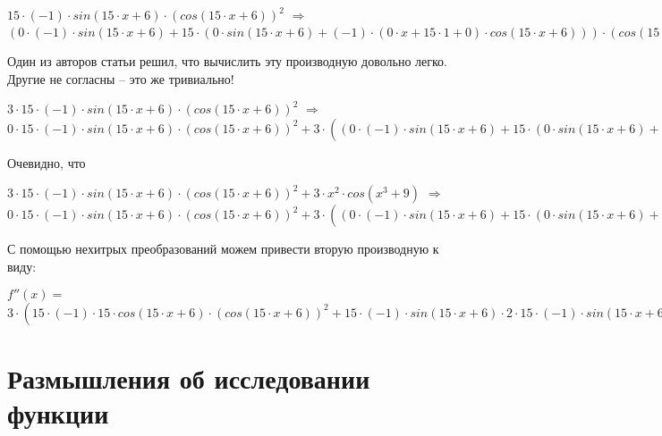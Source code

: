 \documentclass{article}
\begin{document}
$15 \cdot (-1) \cdot  sin (15 \cdot x + 6) \cdot ( cos (15 \cdot x + 6)) ^ {2}$ $\Rightarrow$ $(0 \cdot (-1) \cdot  sin (15 \cdot x + 6) + 15 \cdot (0 \cdot  sin (15 \cdot x + 6) + (-1) \cdot (0 \cdot x + 15 \cdot 1 + 0) \cdot  cos (15 \cdot x + 6))) \cdot ( cos (15 \cdot x + 6)) ^ {2} + 15 \cdot (-1) \cdot  sin (15 \cdot x + 6) \cdot 2 \cdot (0 \cdot x + 15 \cdot 1 + 0) \cdot (-1) \cdot  sin (15 \cdot x + 6) \cdot ( cos (15 \cdot x + 6)) ^ {2 - 1}$

Один из авторов статьи решил, что вычислить эту производную довольно легко. Другие не согласны -- это же тривиально!

$3 \cdot 15 \cdot (-1) \cdot  sin (15 \cdot x + 6) \cdot ( cos (15 \cdot x + 6)) ^ {2}$ $\Rightarrow$ $0 \cdot 15 \cdot (-1) \cdot  sin (15 \cdot x + 6) \cdot ( cos (15 \cdot x + 6)) ^ {2} + 3 \cdot ((0 \cdot (-1) \cdot  sin (15 \cdot x + 6) + 15 \cdot (0 \cdot  sin (15 \cdot x + 6) + (-1) \cdot (0 \cdot x + 15 \cdot 1 + 0) \cdot  cos (15 \cdot x + 6))) \cdot ( cos (15 \cdot x + 6)) ^ {2} + 15 \cdot (-1) \cdot  sin (15 \cdot x + 6) \cdot 2 \cdot (0 \cdot x + 15 \cdot 1 + 0) \cdot (-1) \cdot  sin (15 \cdot x + 6) \cdot ( cos (15 \cdot x + 6)) ^ {2 - 1})$

Очевидно, что

$3 \cdot 15 \cdot (-1) \cdot  sin (15 \cdot x + 6) \cdot ( cos (15 \cdot x + 6)) ^ {2} + 3 \cdot x ^ {2} \cdot  cos (x ^ {3} + 9)$ $\Rightarrow$ $0 \cdot 15 \cdot (-1) \cdot  sin (15 \cdot x + 6) \cdot ( cos (15 \cdot x + 6)) ^ {2} + 3 \cdot ((0 \cdot (-1) \cdot  sin (15 \cdot x + 6) + 15 \cdot (0 \cdot  sin (15 \cdot x + 6) + (-1) \cdot (0 \cdot x + 15 \cdot 1 + 0) \cdot  cos (15 \cdot x + 6))) \cdot ( cos (15 \cdot x + 6)) ^ {2} + 15 \cdot (-1) \cdot  sin (15 \cdot x + 6) \cdot 2 \cdot (0 \cdot x + 15 \cdot 1 + 0) \cdot (-1) \cdot  sin (15 \cdot x + 6) \cdot ( cos (15 \cdot x + 6)) ^ {2 - 1}) + (0 \cdot x ^ {2} + 3 \cdot 2 \cdot 1 \cdot x ^ {2 - 1}) \cdot  cos (x ^ {3} + 9) + 3 \cdot x ^ {2} \cdot (3 \cdot 1 \cdot x ^ {3 - 1} + 0) \cdot (-1) \cdot  sin (x ^ {3} + 9)$

С помощью нехитрых преобразований можем привести вторую производную к виду:

$f''(x) = $ $3 \cdot (15 \cdot (-1) \cdot 15 \cdot  cos (15 \cdot x + 6) \cdot ( cos (15 \cdot x + 6)) ^ {2} + 15 \cdot (-1) \cdot  sin (15 \cdot x + 6) \cdot 2 \cdot 15 \cdot (-1) \cdot  sin (15 \cdot x + 6) \cdot ( cos (15 \cdot x + 6)) ^ {1}) + 3 \cdot 2 \cdot x ^ {1} \cdot  cos (x ^ {3} + 9) + 3 \cdot x ^ {2} \cdot 3 \cdot x ^ {2} \cdot (-1) \cdot  sin (x ^ {3} + 9)$\section{Размышления об исследовании функции}
\end{document}

